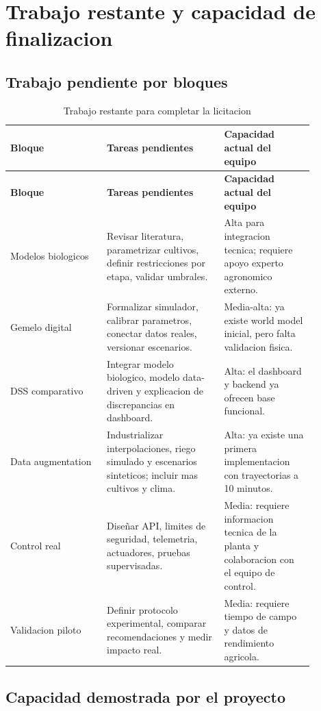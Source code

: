 ﻿\documentclass[11pt,a4paper]{article}
\begin{document}
\newpage

\section{Trabajo restante y capacidad de finalizacion}

\subsection{Trabajo pendiente por bloques}

\begin{longtable}{p{0.28\linewidth}p{0.34\linewidth}p{0.26\linewidth}}
\caption{Trabajo restante para completar la licitacion}\\
\toprule
\textbf{Bloque} & \textbf{Tareas pendientes} & \textbf{Capacidad actual del equipo} \\
\midrule
\endfirsthead
\toprule
\textbf{Bloque} & \textbf{Tareas pendientes} & \textbf{Capacidad actual del equipo} \\
\midrule
\endhead
Modelos biologicos & Revisar literatura, parametrizar cultivos, definir restricciones por etapa, validar umbrales. & Alta para integracion tecnica; requiere apoyo experto agronomico externo. \\ \addlinespace
Gemelo digital & Formalizar simulador, calibrar parametros, conectar datos reales, versionar escenarios. & Media-alta: ya existe world model inicial, pero falta validacion fisica. \\ \addlinespace
DSS comparativo & Integrar modelo biologico, modelo data-driven y explicacion de discrepancias en dashboard. & Alta: el dashboard y backend ya ofrecen base funcional. \\ \addlinespace
Data augmentation & Industrializar interpolaciones, riego simulado y escenarios sinteticos; incluir mas cultivos y clima. & Alta: ya existe una primera implementacion con trayectorias a 10 minutos. \\ \addlinespace
Control real & Diseñar API, limites de seguridad, telemetria, actuadores, pruebas supervisadas. & Media: requiere informacion tecnica de la planta y colaboracion con el equipo de control. \\ \addlinespace
Validacion piloto & Definir protocolo experimental, comparar recomendaciones y medir impacto real. & Media: requiere tiempo de campo y datos de rendimiento agricola. \\
\bottomrule
\end{longtable}

\subsection{Capacidad demostrada por el proyecto}
\end{document}
